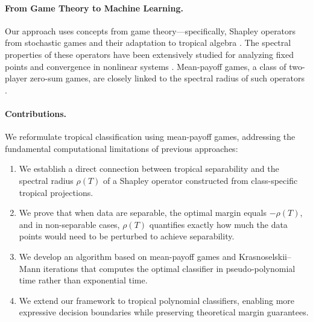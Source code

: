 \documentclass{article}
\begin{document}
\paragraph{From Game Theory to Machine Learning.} Our approach uses concepts from game theory—specifically, Shapley operators from stochastic games \cite{shapley1953} and their adaptation to tropical algebra \cite{kolokoltsov1997}. The spectral properties of these operators have been extensively studied for analyzing fixed points and convergence in nonlinear systems \cite{gaubert2004}. Mean-payoff games, a class of two-player zero-sum games, are closely linked to the spectral radius of such operators \cite{zwick1996}. 

\paragraph{Contributions.} We reformulate tropical classification using mean-payoff games, addressing the fundamental computational limitations of previous approaches:

\begin{enumerate}
    \item We establish a direct connection between tropical separability and the spectral radius $\rho(T)$ of a Shapley operator constructed from class-specific tropical projections.
    
    \item We prove that when data are separable, the optimal margin equals $-\rho(T)$, and in non-separable cases, $\rho(T)$ quantifies exactly how much the data points would need to be perturbed to achieve separability.
    
    \item We develop an algorithm based on mean-payoff games and Krasnoselskii--Mann iterations that computes the optimal classifier in pseudo-polynomial time rather than exponential time.
    
    \item We extend our framework to tropical polynomial classifiers, enabling more expressive decision boundaries while preserving theoretical margin guarantees.
\end{enumerate}
\end{document}
